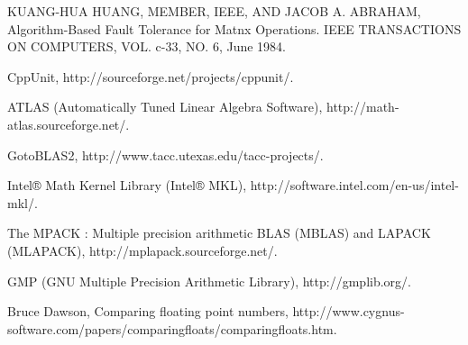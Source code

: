 \documentclass[a4paper, 10pt]{report}
\begin{document}
\begin{thebibliography}{1}

KUANG-HUA HUANG, MEMBER, IEEE, AND JACOB A. ABRAHAM,
Algorithm-Based Fault Tolerance for Matnx Operations.
IEEE TRANSACTIONS ON COMPUTERS,
VOL. c-33,
NO. 6,
June 1984.

CppUnit,
http://sourceforge.net/projects/cppunit/.

ATLAS (Automatically Tuned Linear Algebra Software),
http://math-atlas.sourceforge.net/.

GotoBLAS2,
http://www.tacc.utexas.edu/tacc-projects/.

Intel® Math Kernel Library (Intel® MKL),
http://software.intel.com/en-us/intel-mkl/.

The MPACK : Multiple precision arithmetic BLAS (MBLAS) and LAPACK (MLAPACK),
http://mplapack.sourceforge.net/.

GMP (GNU Multiple Precision Arithmetic Library),
http://gmplib.org/.

Bruce Dawson,
Comparing floating point numbers,
http://www.cygnus-software.com/papers/comparingfloats/comparingfloats.htm.

\end{thebibliography}
\end{document}
